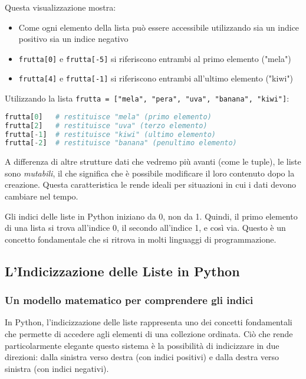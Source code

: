 Questa visualizzazione mostra:
\begin{itemize}
\item Come ogni elemento della lista può essere accessibile utilizzando sia un indice positivo sia un indice negativo
\item \texttt{frutta[0]} e \texttt{frutta[-5]} si riferiscono entrambi al primo elemento ("mela")
\item \texttt{frutta[4]} e \texttt{frutta[-1]} si riferiscono entrambi all'ultimo elemento ("kiwi")
\end{itemize}



Utilizzando la lista \texttt{frutta = ["mela", "pera", "uva", "banana", "kiwi"]}:

\begin{lstlisting}[language=Python]
frutta[0]   # restituisce "mela" (primo elemento)
frutta[2]   # restituisce "uva" (terzo elemento)
frutta[-1]  # restituisce "kiwi" (ultimo elemento)
frutta[-2]  # restituisce "banana" (penultimo elemento)
\end{lstlisting}



\vspace{0.3cm}
A differenza di altre strutture dati che vedremo più avanti (come le tuple), le liste sono \textit{mutabili}, il che significa che è possibile modificare il loro contenuto dopo la creazione. Questa caratteristica le rende ideali per situazioni in cui i dati devono cambiare nel tempo.
\begin{attenzione}
Gli indici delle liste in Python iniziano da 0, non da 1. Quindi, il primo elemento di una lista si trova all'indice 0, il secondo all'indice 1, e così via. Questo è un concetto fondamentale che si ritrova in molti linguaggi di programmazione.
\end{attenzione}

\subsection{L'Indicizzazione delle Liste in Python}\label{IndicizzazioneListe}

\subsubsection{Un modello matematico per comprendere gli indici}

In Python, l'indicizzazione delle liste rappresenta uno dei concetti fondamentali che permette di accedere agli elementi di una collezione ordinata. Ciò che rende particolarmente elegante questo sistema è la possibilità di indicizzare in due direzioni: dalla sinistra verso destra (con indici positivi) e dalla destra verso sinistra (con indici negativi).

